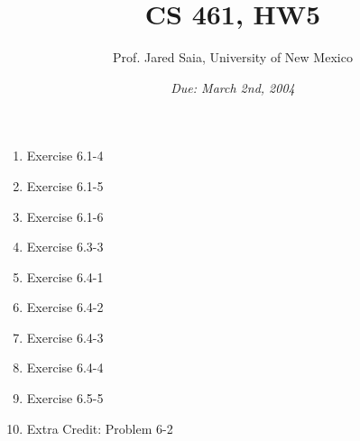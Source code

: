 \documentclass[11pt]{article}
\begin{document}
\title{CS 461, HW5}

\author {Prof. Jared Saia, University of New Mexico}

\date{\emph{Due: March 2nd, 2004}}
\maketitle

\begin{enumerate}

\item Exercise 6.1-4
\item Exercise 6.1-5
\item Exercise 6.1-6
\item Exercise 6.3-3
\item Exercise 6.4-1
\item Exercise 6.4-2
\item Exercise 6.4-3
\item Exercise 6.4-4
\item Exercise 6.5-5
\item Extra Credit: Problem 6-2
\end{enumerate}
\end{document}
